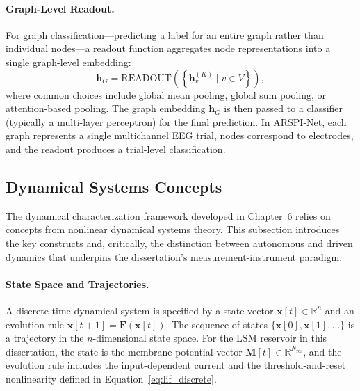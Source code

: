 \paragraph{Graph-Level Readout.}
For graph classification---predicting a label for an entire graph rather than individual nodes---a readout function aggregates node representations into a single graph-level embedding:
\begin{equation}
    \mathbf{h}_G = \text{READOUT}\!\left(\left\{\mathbf{h}_v^{(K)} \mid v \in V\right\}\right),
    \label{eq:readout}
\end{equation}
where common choices include global mean pooling, global sum pooling, or attention-based pooling. The graph embedding $\mathbf{h}_G$ is then passed to a classifier (typically a multi-layer perceptron) for the final prediction. In ARSPI-Net, each graph represents a single multichannel EEG trial, nodes correspond to electrodes, and the readout produces a trial-level classification.

\subsection{Dynamical Systems Concepts}
\label{sec:dynamical_systems}

The dynamical characterization framework developed in Chapter~6 relies on concepts from nonlinear dynamical systems theory. This subsection introduces the key constructs and, critically, the distinction between autonomous and driven dynamics that underpins the dissertation's measurement-instrument paradigm.

\paragraph{State Space and Trajectories.}
A discrete-time dynamical system is specified by a state vector $\mathbf{x}[t] \in \mathbb{R}^n$ and an evolution rule $\mathbf{x}[t+1] = \mathbf{F}(\mathbf{x}[t])$. The sequence of states $\{\mathbf{x}[0], \mathbf{x}[1], \ldots\}$ is a trajectory in the $n$-dimensional state space. For the LSM reservoir in this dissertation, the state is the membrane potential vector $\mathbf{M}[t] \in \mathbb{R}^{N_{\text{res}}}$, and the evolution rule includes the input-dependent current and the threshold-and-reset nonlinearity defined in Equation~\eqref{eq:lif_discrete}.

